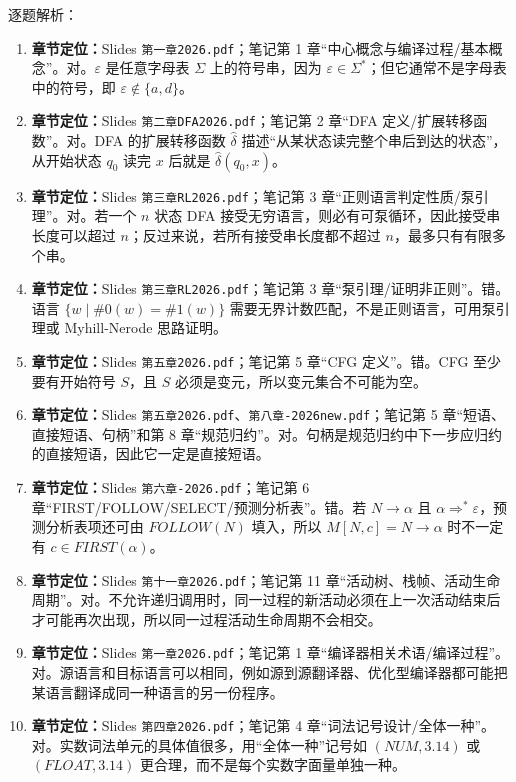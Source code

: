 \documentclass[UTF8,zihao=-4]{ctexart}
\newcommand{\eps}{\varepsilon}
\newcommand{\gto}{\rightarrow}
\newcommand{\kw}[1]{\texttt{#1}}
\begin{document}
逐题解析：
\begin{enumerate}[label=(\arabic*)]
  \item \textbf{章节定位：}Slides \kw{第一章2026.pdf}；笔记第 1 章“中心概念与编译过程/基本概念”。对。$\eps$ 是任意字母表 $\Sigma$ 上的符号串，因为 $\eps\in\Sigma^*$；但它通常不是字母表中的符号，即 $\eps\notin\{a,d\}$。
  \item \textbf{章节定位：}Slides \kw{第二章DFA2026.pdf}；笔记第 2 章“DFA 定义/扩展转移函数”。对。DFA 的扩展转移函数 $\hat{\delta}$ 描述“从某状态读完整个串后到达的状态”，从开始状态 $q_0$ 读完 $x$ 后就是 $\hat{\delta}(q_0,x)$。
  \item \textbf{章节定位：}Slides \kw{第三章RL2026.pdf}；笔记第 3 章“正则语言判定性质/泵引理”。对。若一个 $n$ 状态 DFA 接受无穷语言，则必有可泵循环，因此接受串长度可以超过 $n$；反过来说，若所有接受串长度都不超过 $n$，最多只有有限多个串。
  \item \textbf{章节定位：}Slides \kw{第三章RL2026.pdf}；笔记第 3 章“泵引理/证明非正则”。错。语言 $\{w\mid \#0(w)=\#1(w)\}$ 需要无界计数匹配，不是正则语言，可用泵引理或 Myhill-Nerode 思路证明。
  \item \textbf{章节定位：}Slides \kw{第五章2026.pdf}；笔记第 5 章“CFG 定义”。错。CFG 至少要有开始符号 $S$，且 $S$ 必须是变元，所以变元集合不可能为空。
  \item \textbf{章节定位：}Slides \kw{第五章2026.pdf}、\kw{第八章-2026new.pdf}；笔记第 5 章“短语、直接短语、句柄”和第 8 章“规范归约”。对。句柄是规范归约中下一步应归约的直接短语，因此它一定是直接短语。
  \item \textbf{章节定位：}Slides \kw{第六章-2026.pdf}；笔记第 6 章“FIRST/FOLLOW/SELECT/预测分析表”。错。若 $N\gto\alpha$ 且 $\alpha\Rightarrow^*\eps$，预测分析表项还可由 $FOLLOW(N)$ 填入，所以 $M[N,c]=N\gto\alpha$ 时不一定有 $c\in FIRST(\alpha)$。
  \item \textbf{章节定位：}Slides \kw{第十一章2026.pdf}；笔记第 11 章“活动树、栈帧、活动生命周期”。对。不允许递归调用时，同一过程的新活动必须在上一次活动结束后才可能再次出现，所以同一过程活动生命周期不会相交。
  \item \textbf{章节定位：}Slides \kw{第一章2026.pdf}；笔记第 1 章“编译器相关术语/编译过程”。对。源语言和目标语言可以相同，例如源到源翻译器、优化型编译器都可能把某语言翻译成同一种语言的另一份程序。
  \item \textbf{章节定位：}Slides \kw{第四章2026.pdf}；笔记第 4 章“词法记号设计/全体一种”。对。实数词法单元的具体值很多，用“全体一种”记号如 $(NUM,3.14)$ 或 $(FLOAT,3.14)$ 更合理，而不是每个实数字面量单独一种。
\end{enumerate}
\end{document}
